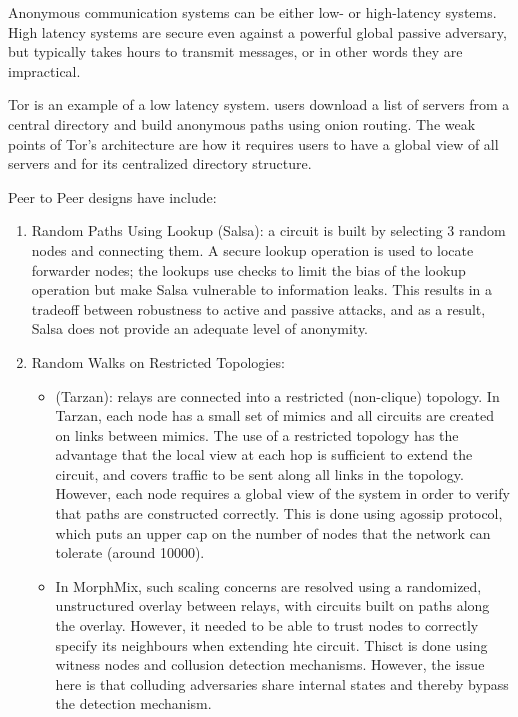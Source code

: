 \documentclass{article}
\begin{document}
Anonymous communication systems can be either low- or high-latency systems.  High latency systems are secure even against a powerful global passive adversary, but typically takes hours to transmit messages, or in other words they are impractical.

Tor is an example of a low latency system.  users download a list of servers from a central directory and build anonymous paths using onion routing.  The weak points of Tor's architecture are how it requires users to have a global view of all servers and for its centralized directory  structure.  

Peer to Peer designs have include:
\begin{enumerate}
\item Random Paths Using Lookup (Salsa): a circuit is built by selecting 3 random nodes and connecting them.  A secure lookup operation is used to locate forwarder nodes; the lookups use checks to limit the bias of the lookup operation but make Salsa vulnerable to information leaks.  This results in a tradeoff between robustness to active and passive attacks, and as a result, Salsa does not provide an adequate level of anonymity.  

\item Random Walks on Restricted Topologies:

\begin{itemize}
\item (Tarzan): relays are connected into a restricted (non-clique) topology. In Tarzan, each node has a small set of mimics and all circuits are created on links between mimics.  The use of a restricted topology has the advantage that the local view at each hop is sufficient to extend the circuit, and covers traffic to be sent along all links in the topology.  However, each node requires a global view of the system in order to verify that paths are constructed correctly. This is done using  agossip protocol, which puts an upper cap on the number of nodes that the network can tolerate (around 10000).  
\item In MorphMix, such scaling concerns are resolved using a randomized, unstructured overlay between relays, with circuits built on paths along the overlay.  However, it needed to be able to trust nodes to correctly specify its neighbours when extending hte circuit.  Thisct is done using witness nodes and collusion detection mechanisms.  However, the issue here is that colluding adversaries share internal states and thereby bypass the detection mechanism.
\end{itemize}

\end{enumerate}
\end{document}
